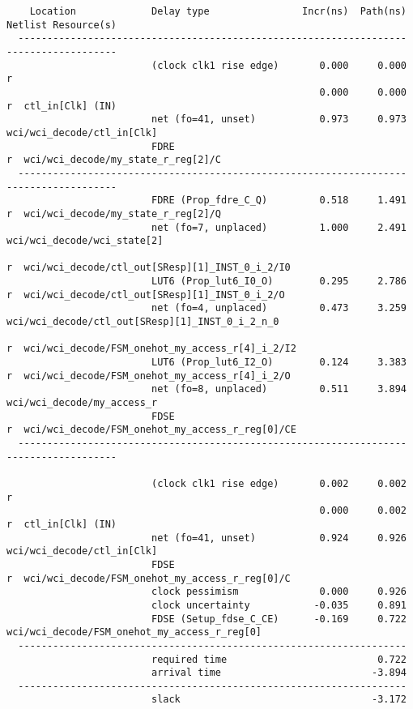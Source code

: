 \documentclass{article}
\begin{document}
\begin{lstlisting}
    Location             Delay type                Incr(ns)  Path(ns)    Netlist Resource(s)
  -------------------------------------------------------------------    -------------------
                         (clock clk1 rise edge)       0.000     0.000 r
                                                      0.000     0.000 r  ctl_in[Clk] (IN)
                         net (fo=41, unset)           0.973     0.973    wci/wci_decode/ctl_in[Clk]
                         FDRE                                         r  wci/wci_decode/my_state_r_reg[2]/C
  -------------------------------------------------------------------    -------------------
                         FDRE (Prop_fdre_C_Q)         0.518     1.491 r  wci/wci_decode/my_state_r_reg[2]/Q
                         net (fo=7, unplaced)         1.000     2.491    wci/wci_decode/wci_state[2]
                                                                      r  wci/wci_decode/ctl_out[SResp][1]_INST_0_i_2/I0
                         LUT6 (Prop_lut6_I0_O)        0.295     2.786 r  wci/wci_decode/ctl_out[SResp][1]_INST_0_i_2/O
                         net (fo=4, unplaced)         0.473     3.259    wci/wci_decode/ctl_out[SResp][1]_INST_0_i_2_n_0
                                                                      r  wci/wci_decode/FSM_onehot_my_access_r[4]_i_2/I2
                         LUT6 (Prop_lut6_I2_O)        0.124     3.383 r  wci/wci_decode/FSM_onehot_my_access_r[4]_i_2/O
                         net (fo=8, unplaced)         0.511     3.894    wci/wci_decode/my_access_r
                         FDSE                                         r  wci/wci_decode/FSM_onehot_my_access_r_reg[0]/CE
  -------------------------------------------------------------------    -------------------

                         (clock clk1 rise edge)       0.002     0.002 r
                                                      0.000     0.002 r  ctl_in[Clk] (IN)
                         net (fo=41, unset)           0.924     0.926    wci/wci_decode/ctl_in[Clk]
                         FDSE                                         r  wci/wci_decode/FSM_onehot_my_access_r_reg[0]/C
                         clock pessimism              0.000     0.926
                         clock uncertainty           -0.035     0.891
                         FDSE (Setup_fdse_C_CE)      -0.169     0.722    wci/wci_decode/FSM_onehot_my_access_r_reg[0]
  -------------------------------------------------------------------
                         required time                          0.722
                         arrival time                          -3.894
  -------------------------------------------------------------------
                         slack                                 -3.172





\end{lstlisting}
\end{document}
